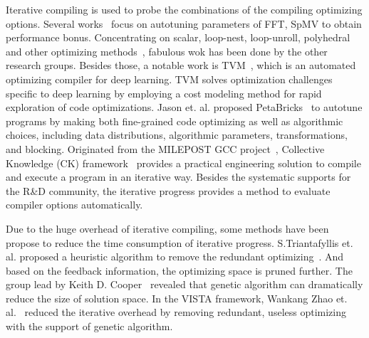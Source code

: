 \documentclass[bst/sn-mathphys]{sn-jnl}%
\theoremstyle{thmstyleone}%
\theoremstyle{thmstyletwo}%
\theoremstyle{thmstylethree}%
\begin{document}
Iterative compiling is used to probe the combinations of the compiling 
optimizing options. Several 
works~\cite{guo2010auto,nukada2009auto,song2014designing} focus on autotuning
parameters of FFT, SpMV to obtain performance bonus. Concentrating on 
scalar, loop-nest, loop-unroll, polyhedral and other optimizing 
methods~\cite{ashouri2012design,fang2015practical,fursin2002evaluating,
kisuki2000iterative,kisuki2000combined,pouchet2007iterative}, 
fabulous wok has been done by the other research groups. Besides those, a 
notable work is TVM~\cite{chen2018tvm}, which is an automated optimizing 
compiler for deep learning. TVM solves optimization challenges specific to 
deep learning by employing a cost modeling method for rapid exploration of 
code optimizations. Jason et. al. proposed PetaBricks~\cite{ansel2009petabricks}
to autotune programs by making both fine-grained code optimizing as well as 
algorithmic choices, including data distributions, algorithmic parameters, 
transformations, and blocking. Originated from the MILEPOST GCC 
project~\cite{fursin2011milepost}, Collective Knowledge (CK) 
framework~\cite{fursin2021collective} provides a practical engineering solution 
to compile and execute a program in an iterative way. Besides the systematic 
supports for the R\&D community, the iterative progress provides a method to 
evaluate compiler options automatically.

Due to the huge overhead of iterative compiling, some methods have been propose
to reduce the time consumption of iterative progress. 
S.Triantafyllis et. al. proposed a heuristic algorithm to remove the redundant 
optimizing~\cite{triantafyllis2003compiler}. And based on the feedback 
information, the optimizing space is pruned further. The group lead by Keith D. 
Cooper~\cite{chabbi2011efficiently} revealed that genetic algorithm can 
dramatically reduce the size of solution space. In the VISTA framework, Wankang Zhao et. al.~\cite{zhao2002vista}  reduced the iterative overhead by removing 
redundant, useless optimizing with the support of genetic algorithm.
\end{document}
